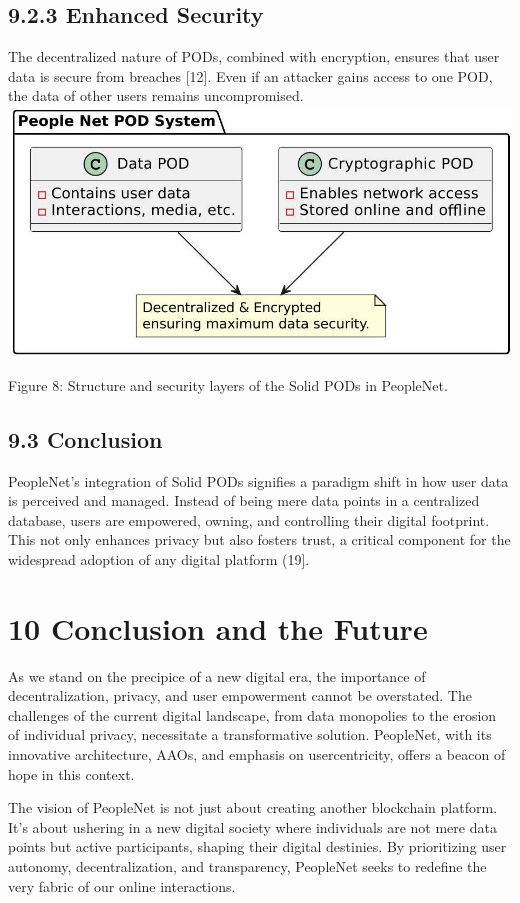 \documentclass[10pt]{article}
\begin{document}
\subsection*{9.2.3 Enhanced Security}
The decentralized nature of PODs, combined with encryption, ensures that user data is secure from breaches [12]. Even if an attacker gains access to one POD, the data of other users remains uncompromised.\\
\includegraphics[max width=\textwidth, center]{2025_03_06_545dea0014012947d15fg-09}

Figure 8: Structure and security layers of the Solid PODs in PeopleNet.

\subsection*{9.3 Conclusion}
PeopleNet's integration of Solid PODs signifies a paradigm shift in how user data is perceived and managed. Instead of being mere data points in a centralized database, users are empowered, owning, and controlling their digital footprint. This not only enhances privacy but also fosters trust, a critical component for the widespread adoption of any digital platform (19].

\section*{10 Conclusion and the Future}
As we stand on the precipice of a new digital era, the importance of decentralization, privacy, and user empowerment cannot be overstated. The challenges of the current digital landscape, from data monopolies to the erosion of individual privacy, necessitate a transformative solution. PeopleNet, with its innovative architecture, AAOs, and emphasis on usercentricity, offers a beacon of hope in this context.

The vision of PeopleNet is not just about creating another blockchain platform. It's about ushering in a new digital society where individuals are not mere data points but active participants, shaping their digital destinies. By prioritizing user autonomy, decentralization, and transparency, PeopleNet seeks to redefine the very fabric of our online interactions.
\end{document}
